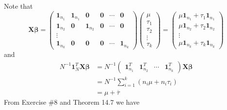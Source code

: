 \bigskip
\noindent
Note that
\[
\mathbf X\bm\beta=
\begin{pmatrix}
\mathbf 1_{n_1} & \mathbf1_{n_1} & \mathbf 0 & \mathbf 0
& \cdots & \mathbf 0\\
\mathbf 1_{n_2} & \mathbf 0 & \mathbf1_{n_2} & \mathbf0 & \cdots & \mathbf0\\
\vdots\\
\mathbf1_{n_k} & \mathbf0 & \mathbf0 & \mathbf0 & \cdots
& \mathbf1_{n_k}
\end{pmatrix}
\begin{pmatrix}
\mu\\
\tau_1\\
\tau_2\\
\vdots\\
\tau_k
\end{pmatrix}
=
\begin{pmatrix}
\mu\mathbf1_{n_1}+\tau_1\mathbf1_{n_1}\\
\mu\mathbf1_{n_2}+\tau_2\mathbf1_{n_2}\\
\vdots\\
\mu\mathbf1_{n_k}+\tau_k\mathbf1_{n_k}
\end{pmatrix}
\]
and
\begin{align*}
N^{-1}\mathbf1_N^T\mathbf X\bm\beta
&=
N^{-1}
\begin{pmatrix}
\mathbf1_{n_1}^T&\mathbf1_{n_2}^T
&\cdots&\mathbf1_{n_k}^T
\end{pmatrix}\mathbf X\bm\beta\\
&=N^{-1}\sum_{i=1}^k(n_i\mu+n_i\tau_i)\\
&=\mu+\overline{\tau}
\end{align*}
%
From Exercise \#8 and Theorem 14.7 we have
